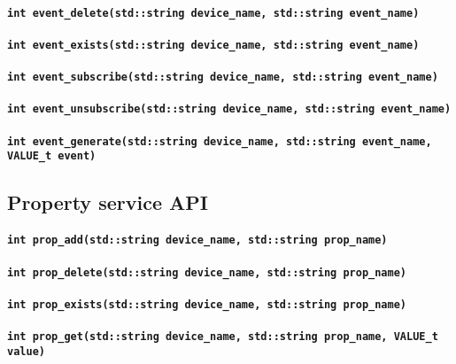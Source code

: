 \documentclass{note}
\begin{document}
\paragraph{\small\textcolor{red2}{\tt{}int event\_delete(std::string device\_name, std::string event\_name)}}
\paragraph{\small\textcolor{red2}{\tt{}int event\_exists(std::string device\_name, std::string event\_name)}}
\paragraph{\small\textcolor{red2}{\tt{}int event\_subscribe(std::string device\_name, std::string event\_name)}}
\paragraph{\small\textcolor{red2}{\tt{}int event\_unsubscribe(std::string device\_name, std::string event\_name)}}
\paragraph{\small\textcolor{red2}{\tt{}int event\_generate(std::string device\_name, std::string event\_name, VALUE\_t event)}}


\subsection{Property service API}
\paragraph{\small\textcolor{red2}{\tt{}int prop\_add(std::string device\_name, std::string prop\_name)}}
\paragraph{\small\textcolor{red2}{\tt{}int prop\_delete(std::string device\_name, std::string prop\_name)}}
\paragraph{\small\textcolor{red2}{\tt{}int prop\_exists(std::string device\_name, std::string prop\_name)}}
\paragraph{\small\textcolor{red2}{\tt{}int prop\_get(std::string device\_name, std::string prop\_name, VALUE\_t value)}}
\end{document}
